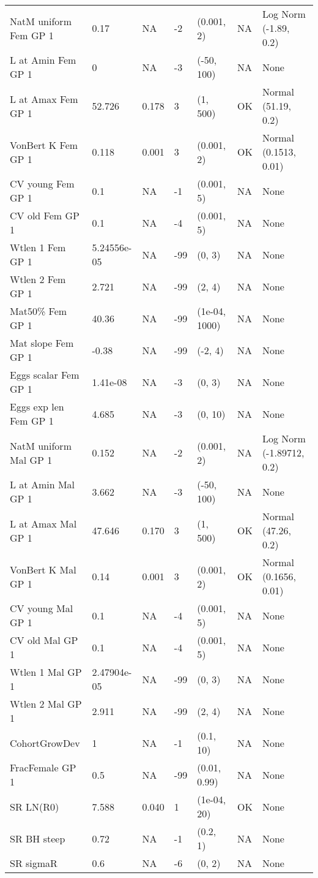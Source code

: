 \documentclass[11pt,
  english,
  letterpaper,
]{article}
\begin{document}
\begin{landscape}
\begin{longtable}[t]{>{\raggedright\arraybackslash}p{7.5cm}lllll>{\raggedright\arraybackslash}p{3.5cm}}
\endfoot
\bottomrule
\endlastfoot
NatM uniform Fem GP 1 & 0.17 & NA & -2 & (0.001, 2) & NA & Log Norm (-1.89, 0.2)\\
L at Amin Fem GP 1 & 0 & NA & -3 & (-50, 100) & NA & None\\
L at Amax Fem GP 1 & 52.726 & 0.178 & 3 & (1, 500) & OK & Normal (51.19, 0.2)\\
VonBert K Fem GP 1 & 0.118 & 0.001 & 3 & (0.001, 2) & OK & Normal (0.1513, 0.01)\\
CV young Fem GP 1 & 0.1 & NA & -1 & (0.001, 5) & NA & None\\
CV old Fem GP 1 & 0.1 & NA & -4 & (0.001, 5) & NA & None\\
Wtlen 1 Fem GP 1 & 5.24556e-05 & NA & -99 & (0, 3) & NA & None\\
Wtlen 2 Fem GP 1 & 2.721 & NA & -99 & (2, 4) & NA & None\\
Mat50\% Fem GP 1 & 40.36 & NA & -99 & (1e-04, 1000) & NA & None\\
Mat slope Fem GP 1 & -0.38 & NA & -99 & (-2, 4) & NA & None\\
Eggs scalar Fem GP 1 & 1.41e-08 & NA & -3 & (0, 3) & NA & None\\
Eggs exp len Fem GP 1 & 4.685 & NA & -3 & (0, 10) & NA & None\\
NatM uniform Mal GP 1 & 0.152 & NA & -2 & (0.001, 2) & NA & Log Norm (-1.89712, 0.2)\\
L at Amin Mal GP 1 & 3.662 & NA & -3 & (-50, 100) & NA & None\\
L at Amax Mal GP 1 & 47.646 & 0.170 & 3 & (1, 500) & OK & Normal (47.26, 0.2)\\
VonBert K Mal GP 1 & 0.14 & 0.001 & 3 & (0.001, 2) & OK & Normal (0.1656, 0.01)\\
CV young Mal GP 1 & 0.1 & NA & -4 & (0.001, 5) & NA & None\\
CV old Mal GP 1 & 0.1 & NA & -4 & (0.001, 5) & NA & None\\
Wtlen 1 Mal GP 1 & 2.47904e-05 & NA & -99 & (0, 3) & NA & None\\
Wtlen 2 Mal GP 1 & 2.911 & NA & -99 & (2, 4) & NA & None\\
CohortGrowDev & 1 & NA & -1 & (0.1, 10) & NA & None\\
FracFemale GP 1 & 0.5 & NA & -99 & (0.01, 0.99) & NA & None\\
SR LN(R0) & 7.588 & 0.040 & 1 & (1e-04, 20) & OK & None\\
SR BH steep & 0.72 & NA & -1 & (0.2, 1) & NA & None\\
SR sigmaR & 0.6 & NA & -6 & (0, 2) & NA & None\\

\end{longtable}
\end{landscape}
\end{document}
